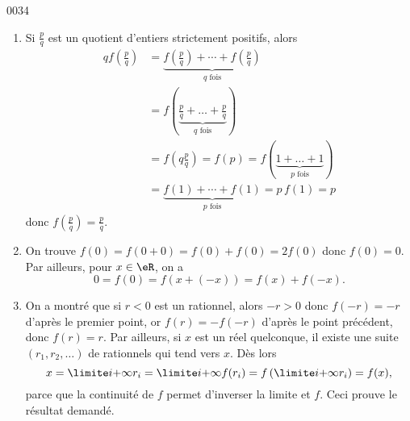 
\begin{corrige}{0034}

\begin{enumerate}
\item Si $\frac p q$ est un quotient d'entiers strictement positifs,
  alors
  \begin{align*}
      q f(\frac pq) &= \underbrace{f(\frac pq) + \cdots + f(\frac pq)}_{q \text{ fois}}\\
    &= f(\underbrace{\frac pq + \ldots
    + \frac pq}_{q \text{ fois}})\\
    &= f(q \frac pq) = f(p) = f(\underbrace{1 +
    \ldots + 1}_{p\text{ fois}})\\
    &= \underbrace{f(1)+\cdots+f(1)}_{p\text{ fois}} = p \, f(1) = p
  \end{align*}
  donc $f(\frac pq) = \frac pq$.

\item On trouve $f(0) = f(0+0) = f(0)+f(0) = 2 f(0)$ donc
  $f(0)=0$. Par ailleurs, pour $x \in \eR$, on a
  \begin{equation*}
    0 = f(0) = f(x+(-x)) = f(x) + f(-x).
  \end{equation*}

\item On a montré que si $r < 0$ est un rationnel, alors $-r > 0$ donc $f(-r) = -r$ d'après le premier point, or $f(r) = -f(-r)$ d'après le point précédent, donc $f(r) = r$. Par ailleurs, si $x$ est un réel quelconque, il existe une suite $(r_1, r_2, \ldots)$ de rationnels qui tend vers $x$. Dès lors
  \begin{equation*}
    x = \limite i {+\infty} r_i =  \limite i {+\infty} f(r_i) = f\left(\limite i {+\infty} r_i\right) = f(x),
  \end{equation*}
parce que la continuité de $f$ permet d'inverser la limite et $f$. Ceci prouve le résultat demandé.
\end{enumerate}

\end{corrige}
